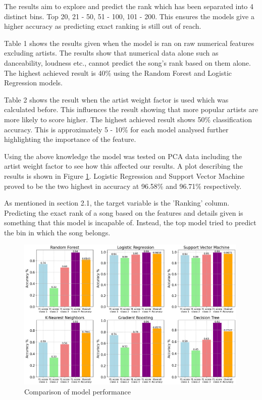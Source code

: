 \documentclass{article}
\begin{document}
The results aim to explore and predict the rank which has been separated into 4 distinct bins. Top 20, 21 - 50, 51 - 100, 101 - 200. This ensures the models give a higher accuracy as predicting exact ranking is still out of reach. 

Table 1 shows the results given when the model is ran on raw numerical features excluding artists. The results show that numerical data alone such as danceability, loudness etc., cannot predict the song's rank based on them alone. The highest achieved result is 40\% using the Random Forest and Logistic Regression models.


 
Table 2 shows the result when the artist weight factor is used which was calculated before. This influences the result showing that more popular artists are more likely to score higher. The highest achieved result shows 50\% classification accuracy. This is approximately 5 - 10\% for each model analysed further highlighting the importance of the feature.

Using the above knowledge the model was tested on PCA data including the artist weight factor to see how this affected our results. A plot describing the results is shown in Figure \ref{res}. Logistic Regression and Support Vector Machine proved to be the two highest in accuracy at 96.58\% and 96.71\% respectively. 

As mentioned in section 2.1, the target variable is the 'Ranking' column. Predicting the exact rank of a song based on the features and details given is something that this model is incapable of. Instead, the top model tried to predict the bin in which the song belongs. 
\begin{figure}[h]
\centering
\includegraphics[width=0.99\textwidth]{result.png}

\caption{Comparison of model performance}
\label{res}
\end{figure}
\end{document}
